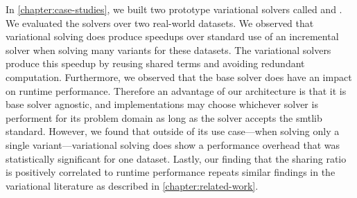 In \autoref{chapter:case-studies}, we built two prototype variational solvers
called \vsat{} and \vsmt{}. We evaluated the solvers over two real-world
datasets. We observed that variational solving does produce speedups over
standard use of an incremental solver when solving many variants for these
datasets. The variational solvers produce this speedup by reusing shared terms
and avoiding redundant computation. Furthermore, we observed that the base
solver does have an impact on runtime performance. Therefore an advantage of our
architecture is that it is base solver agnostic, and implementations may choose
whichever solver is performent for its problem domain as long as the solver
accepts the \acl{smtlib} standard. However, we found that outside of its use
case---when solving only a single variant---variational solving does show a
performance overhead that was statistically significant for one dataset. Lastly,
our finding that the sharing ratio is positively correlated to runtime
performance repeats similar findings in the variational literature as described
in \autoref{chapter:related-work}.
